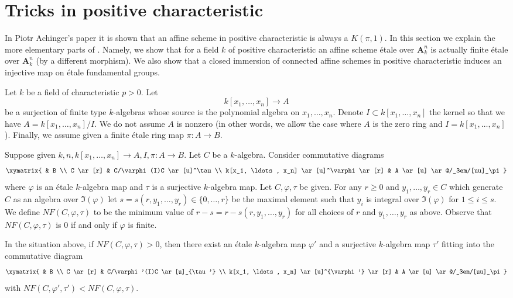\section{Tricks in positive characteristic}
\label{section-achinger}

\noindent
In Piotr Achinger's paper \cite{Achinger} it is shown that an
affine scheme in positive characteristic is always a $K(\pi, 1)$.
In this section we explain the more elementary parts of \cite{Achinger}.
Namely, we show that for a field $k$ of positive characteristic
an affine scheme \'etale over $\mathbf{A}^n_k$ is actually finite \'etale
over $\mathbf{A}^n_k$ (by a different morphism). We also show
that a closed immersion of connected affine schemes
in positive characteristic induces an injective map on
\'etale fundamental groups.

\medskip\noindent
Let $k$ be a field of characteristic $p > 0$.
Let
$$
k[x_1, \ldots, x_n] \longrightarrow A
$$
be a surjection of finite type $k$-algebras whose source is the
polynomial algebra on $x_1, \ldots, x_n$. Denote
$I \subset k[x_1, \ldots, x_n]$ the kernel so that we have
$A = k[x_1, \ldots, x_n]/I$. We do not assume $A$ is nonzero
(in other words, we allow the case where $A$ is the zero ring
and $I = k[x_1, \ldots, x_n]$). Finally, we assume given a
finite \'etale ring map $\pi : A \to B$.

\medskip\noindent
Suppose given $k, n, k[x_1, \ldots, x_n] \to A, I, \pi : A \to B$.
Let $C$ be a $k$-algebra. Consider
commutative diagrams
$$
\xymatrix{
& B \\
C \ar[r] & C/\varphi(I)C \ar[u]^\tau \\
k[x_1, \ldots, x_n] \ar[u]^\varphi \ar[r] &
A \ar[u] \ar@/_3em/[uu]_\pi
}
$$
where $\varphi$ is an \'etale $k$-algebra map and $\tau$ is a
surjective $k$-algebra map.
Let $C, \varphi, \tau$ be given. For any $r \geq 0$ and
$y_1, \ldots, y_r \in C$ which generate $C$ as an algebra over
$\Im(\varphi)$ let $s = s(r, y_1, \ldots, y_r) \in \{0, \ldots, r\}$
be the maximal element such that $y_i$ is integral over $\Im(\varphi)$
for $1 \leq i \leq s$. We define $NF(C, \varphi, \tau)$
to be the minimum value of
$r - s = r - s(r, y_1, \ldots, y_r)$ for all choices of
$r$ and $y_1, \ldots, y_r$ as above.
Observe that $NF(C, \varphi, \tau)$ is $0$ if and only if $\varphi$ is finite.

\begin{lemma}
\label{lemma-lower-invariant}
In the situation above, if $NF(C, \varphi, \tau) > 0$, then there exist
an \'etale $k$-algebra map $\varphi'$ and a surjective $k$-algebra map
$\tau'$ fitting into the commutative diagram
$$
\xymatrix{
& B \\
C \ar[r] & C/\varphi'(I)C \ar[u]_{\tau'} \\
k[x_1, \ldots, x_n] \ar[u]^{\varphi'} \ar[r] &
A \ar[u] \ar@/_3em/[uu]_\pi
}
$$
with $NF(C, \varphi', \tau') < NF(C, \varphi, \tau)$.
\end{lemma}

